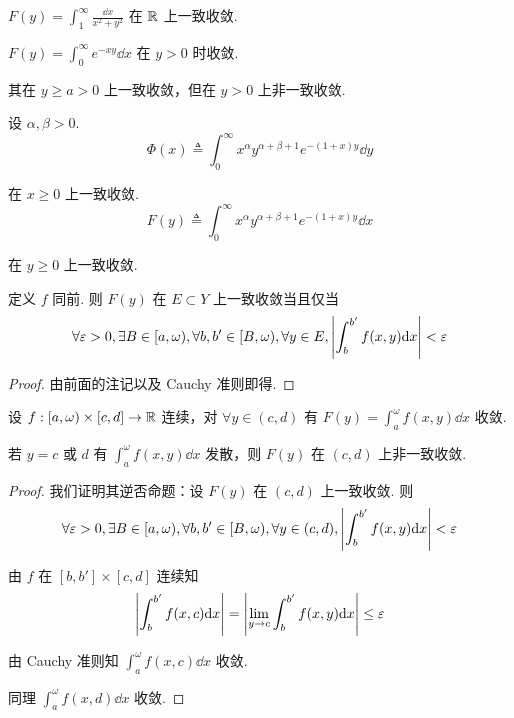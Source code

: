 \begin{example}
    $F(y)=\displaystyle\int_1^\infty\frac{\dd x}{x^2+y^2}$ 在 $\mathbb{R}$ 上一致收敛.
\end{example}

\begin{example}
    $F(y)=\displaystyle\int_0^\infty e^{-xy}\dd x$ 在 $y>0$ 时收敛.

    其在 $y\ge a>0$ 上一致收敛，但在 $y>0$ 上非一致收敛.
\end{example}

\begin{example}
    设 $\alpha,\beta>0$.
$$
\Phi(x)\triangleq\int_0^\infty x^\alpha y^{\alpha+\beta+1}e^{-(1+x)y}\dd y
$$

    在 $x\ge 0$ 上一致收敛.
$$
F(y)\triangleq\int_0^\infty x^\alpha y^{\alpha+\beta+1}e^{-(1+x)y}\dd x
$$

    在 $y\ge 0$ 上一致收敛.
\end{example}


\begin{property}
    定义 $f$ 同前. 则 $F(y)$ 在 $E\subset Y$ 上一致收敛当且仅当
$$
\forall\varepsilon>0,\exists B\in [a,\omega),\forall b,b'\in[B,\omega),\forall y\in E,\left\lvert{\int_b^{b'}f(x,y)\mathrm{d}x}\right\rvert<\varepsilon
$$
\end{property}
\begin{proof}
    由前面的注记以及 Cauchy 准则即得.
\end{proof}

\begin{inference}
    设 $f:[a,\omega)\times[c,d]\to\mathbb{R}$ 连续，对 $\forall y\in(c,d)$ 有 $F(y)=\displaystyle\int_a^\omega f(x,y)\dd x$ 收敛.

    若 $y=c$ 或 $d$ 有 $\displaystyle\int_a^\omega f(x,y)\dd x$ 发散，则 $F(y)$ 在 $(c,d)$ 上非一致收敛.
\end{inference}
\begin{proof}
    我们证明其逆否命题：设 $F(y)$ 在 $(c,d)$ 上一致收敛. 则
$$
\forall\varepsilon>0,\exists B\in[a,\omega),\forall b,b'\in[B,\omega),\forall y\in(c,d),\left\lvert{\int_b^{b'}f(x,y)\mathrm{d}x}\right\rvert<\varepsilon
$$

    由 $f$ 在 $[b,b']\times [c,d]$ 连续知
$$
\left\lvert{\int_b^{b'}f(x,c)\mathrm{d}x}\right\rvert=\left\lvert{\lim_{y\to c}\int_b^{b'}f(x,y)\mathrm{d}x}\right\rvert\le\varepsilon
$$

    由 Cauchy 准则知 $\displaystyle\int_a^\omega f(x,c)\dd x$ 收敛.

    同理 $\displaystyle\int_a^\omega f(x,d)\dd x$ 收敛.
\end{proof}

